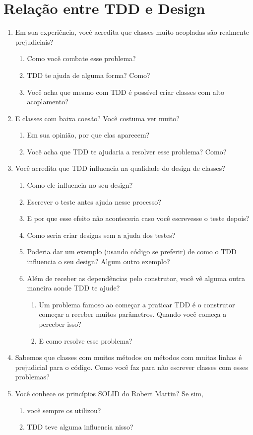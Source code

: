 \section{Relação entre TDD e Design}

\begin{enumerate}
	\item{Em sua experiência, você acredita que classes muito acopladas são realmente prejudiciais?}
		\begin{enumerate}
			\item Como você combate esse problema?
			\item TDD te ajuda de alguma forma? Como?
			\item Você acha que mesmo com TDD é possível criar classes com alto acoplamento? 
		\end{enumerate}
	\item{E classes com baixa coesão? Você costuma ver muito?}
		\begin{enumerate}
			\item Em sua opinião, por que elas aparecem?
			\item Você acha que TDD te ajudaria a resolver esse problema? Como?
		\end{enumerate}
	\item Você acredita que TDD influencia na qualidade do design de classes?
	\begin{enumerate}
		\item Como ele influencia no seu design?
		\item Escrever o teste antes ajuda nesse processo?
		\item E por que esse efeito não aconteceria caso você escrevesse o teste depois?
		\item Como seria criar designs sem a ajuda dos testes?
		\item Poderia dar um exemplo (usando código se preferir) de como o TDD influencia o seu design? Algum outro exemplo?
		\item Além de receber as dependências pelo construtor, você vê alguma outra maneira aonde TDD te ajude?
			\begin{enumerate}
				\item Um problema famoso ao começar a praticar TDD é o construtor começar a receber muitos parâmetros. Quando você começa a perceber isso?
				\item E como resolve esse problema?
			\end{enumerate}
	\end{enumerate}
	\item Sabemos que classes com muitos métodos ou métodos com muitas linhas é prejudicial para o código. Como você faz para não escrever classes com esses problemas?
	\item Você conhece os princípios SOLID do Robert Martin? Se sim,
	\begin{enumerate}
		\item você sempre os utilizou?
		\item TDD teve alguma influencia nisso?
	\end{enumerate}
\end{enumerate}

